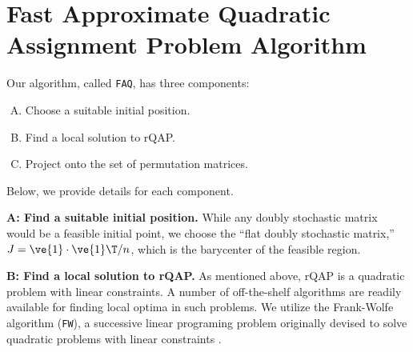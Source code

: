 \documentclass[10pt,journal,cspaper,compsoc]{IEEEtran}
\begin{document}





\section{Fast Approximate Quadratic Assignment Problem Algorithm} %
\label{sec:faq}


Our algorithm, called \texttt{FAQ}, has three components:
\begin{enumerate}[A.]
	\item Choose a suitable initial position. %
	\item Find a local solution to rQAP. %
	\item Project onto the set of permutation matrices. %
\end{enumerate}
Below, we provide details for each component.

\textbf{A: Find a suitable initial position.}  While any doubly stochastic matrix would be a feasible initial point, we choose the 
``flat doubly  stochastic matrix,'' $J=\ve{1} \cdot \ve{1}\T/n$, which is the barycenter of the feasible region.


\textbf{B: Find a local solution to rQAP.} As mentioned above, rQAP is a quadratic problem with linear constraints.  A number of off-the-shelf algorithms are readily available for finding local optima in such problems.  We utilize the Frank-Wolfe algorithm (\texttt{FW}), a successive linear programing problem originally devised to solve quadratic problems with linear constraints \cite{Frank1956, Bradley1977}.
\end{document}
